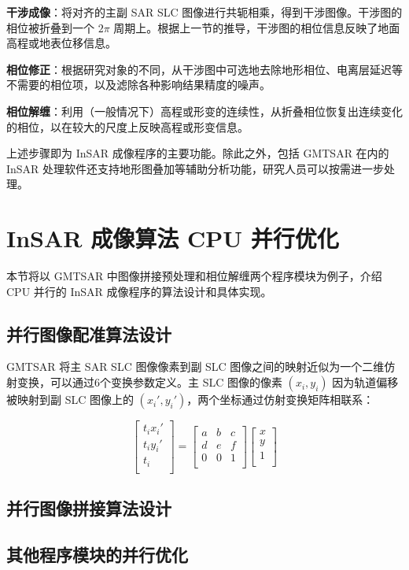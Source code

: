 \textbf{干涉成像}：将对齐的主副 SAR SLC 图像进行共轭相乘，得到干涉图像。干涉图的相位被折叠到一个 $2\pi$ 周期上。根据上一节的推导，干涉图的相位信息反映了地面高程或地表位移信息。

\textbf{相位修正}：根据研究对象的不同，从干涉图中可选地去除地形相位、电离层延迟等不需要的相位项，以及滤除各种影响结果精度的噪声。

\textbf{相位解缠}：利用（一般情况下）高程或形变的连续性，从折叠相位恢复出连续变化的相位，以在较大的尺度上反映高程或形变信息。

上述步骤即为 InSAR 成像程序的主要功能。除此之外，包括 GMTSAR 在内的 InSAR 处理软件还支持地形图叠加等辅助分析功能，研究人员可以按需进一步处理。

\section{InSAR 成像算法 CPU 并行优化}

本节将以 GMTSAR 中图像拼接预处理和相位解缠两个程序模块为例子，介绍 CPU 并行的 InSAR 成像程序的算法设计和具体实现。

\subsection{并行图像配准算法设计}

GMTSAR 将主 SAR SLC 图像像素到副 SLC 图像之间的映射近似为一个二维仿射变换，可以通过6个变换参数定义。主 SLC 图像的像素 $(x_i, y_i)$ 因为轨道偏移被映射到副 SLC 图像上的 $(x_i', y_i')$，两个坐标通过仿射变换矩阵相联系：

\begin{equation}
\begin{bmatrix}
  t_i x_i' \\
  t_i y_i' \\
  t_i \\
\end{bmatrix}
= \begin{bmatrix}
       a & b & c \\
       d & e & f \\
       0 & 0 & 1 \\
\end{bmatrix}
\begin{bmatrix}
  x \\
  y \\
  1 \\
\end{bmatrix}
\end{equation}




\subsection{并行图像拼接算法设计}

\subsection{其他程序模块的并行优化}
